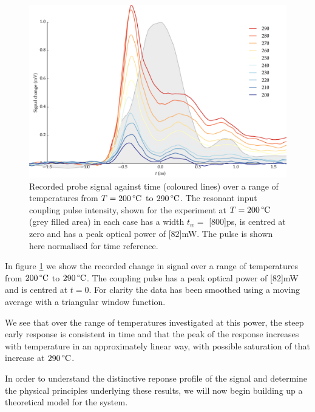     \begin{figure}[h]
      \includegraphics[width=\linewidth]
        {figs/06_simultons/1704_temp_scaled_data_colormap_fig1.pdf}
      \caption{
      Recorded probe signal against time (coloured lines) over a range  of
      temperatures from $T = \unit[200]{\textrm{\textdegree C}}$ to
      $\unit[290]{\textrm{\textdegree C}}$.  The resonant input coupling pulse
      intensity, shown for the experiment at $T = \unit[200]{\textrm{\textdegree
      C}}$ (grey filled area) in each case  has a width $t_w = $
      \unit[$800$]{ps}, is centred at zero and has a peak  optical power of
      \unit[$82$]{mW}. The pulse is shown here normalised for  time reference.
      }
      \label{fig:data_0703_temp_all}
    \end{figure}

    In figure \ref{fig:data_0703_temp_all} we show the recorded change in signal
    over a range of temperatures from $\unit[200]{\textrm{\textdegree C}}$ to
    $\unit[290]{\textrm{\textdegree C}}$. The coupling pulse has a peak optical
    power of \unit[$82$]{mW} and is centred at $t = 0$. For clarity the data has
    been smoothed using a moving average with a triangular window function.

    We see that over the range of temperatures investigated at this power, the
    steep early response is consistent in time and that the peak of the response
    increases with temperature in an approximately linear way, with possible saturation of that increase at $\unit[290]{\textrm{\textdegree C}}$.

    In order to understand the distinctive reponse profile of the signal and
    determine the physical principles underlying these results, we will now
    begin building up a theoretical model for the system.
